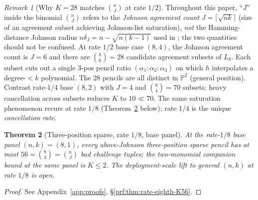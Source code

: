 \documentclass[11pt]{article}
\newtheorem{theorem}{Theorem}[section]
\theoremstyle{definition}
\theoremstyle{remark}
\newtheorem{remark}[theorem]{Remark}
\begin{document}
\begin{remark}[Why $K = 28$ matches $\binom{n}{J}$ at rate $1/2$]
\label{rem:K28-binomial}
Throughout this paper, ``$J$'' inside the binomial $\binom{n}{J}$
refers to the \emph{Johnson agreement count}
$J = \lceil \sqrt{nk} \rceil$ (size of an agreement subset achieving
Johnson-list saturation), \emph{not} the Hamming-distance Johnson
radius $n \delta_J = n - \sqrt{n(k-1)}$ used in \cite{BCIKS}; the two
quantities should not be confused.
At rate $1/2$ base case $(8, 4)$, the Johnson agreement count is
$J = 6$ and there are $\binom{8}{6} = 28$ candidate agreement subsets of
$L_8$. Each subset cuts out a single $3$-pos pencil ratio
$(\alpha_1 : \alpha_2 : \alpha_3)$ on which $h$ interpolates a degree-$<k$
polynomial. The $28$ pencils are all distinct in $\mathbb P^2$ (general
position). Contrast rate-$1/4$ base $(8, 2)$ with $J = 4$ and
$\binom{8}{4} = 70$ subsets: heavy cancellation across subsets reduces
$K$ to $10 \ll 70$. The same saturation phenomenon recurs at rate $1/8$
(Theorem~\ref{thm:rate-eighth-K56} below); rate $1/4$ is the unique
\emph{cancellation rate}.
\end{remark}

\begin{theorem}[Three-position sparse, rate $1/8$, base panel]
\label{thm:rate-eighth-K56}
At the rate-$1/8$ base panel $(n, k) = (8, 1)$, every above-Johnson
three-position sparse pencil has at most
$56 = \binom{8}{3} = \binom{n}{J}$ bad challenge tuples; the
two-monomial companion bound at the same panel is $K \leq 2$. The
deployment-scale lift to general $(n, k)$ at rate $1/8$ is open.
\end{theorem}

\begin{proof}[Proof] See Appendix~\ref{app:proofs}, \S\ref{prf:thm:rate-eighth-K56}.\end{proof}
\end{document}
